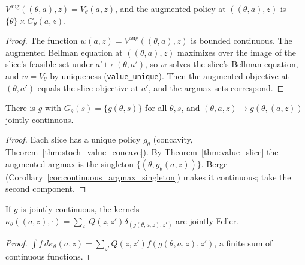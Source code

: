 \begin{theorem}
\label{thm:value_slice}
\leanok
{}
$V^{\mathrm{aug}}((\theta,a),z) = V_\theta(a,z)$, and the augmented policy at $((\theta,a),z)$ is
$\{\theta\}\times G_\theta(a,z)$.
\end{theorem}
\begin{proof}
\leanok
The function $w(a,z) = V^{\mathrm{aug}}((\theta,a),z)$ is bounded continuous. The augmented Bellman equation at
$((\theta,a),z)$ maximizes over the image of the slice's feasible set under $a'\mapsto(\theta,a')$, so $w$ solves
the slice's Bellman equation, and $w = V_\theta$ by uniqueness (\texttt{value\_unique}). Then the augmented
objective at $(\theta,a')$ equals the slice objective at $a'$, and the argmax sets correspond.
\end{proof}

\begin{theorem}
\label{thm:exists_joint_policy}
\leanok
{}
There is $g$ with $G_\theta(s) = \{g(\theta,s)\}$ for all $\theta, s$, and $(\theta,a,z)\mapsto g(\theta,(a,z))$
jointly continuous.
\end{theorem}
\begin{proof}
\leanok
{}
Each slice has a unique policy $g_\theta$ (concavity, Theorem~\ref{thm:stoch_value_concave}). By
Theorem~\ref{thm:value_slice} the augmented argmax is the singleton $\{(\theta, g_\theta(a,z))\}$. Berge
(Corollary~\ref{cor:continuous_argmax_singleton}) makes it continuous; take the second component.
\end{proof}

\begin{lemma}
\label{lem:isJointlyFeller_policyKernel}
\leanok
{}
If $g$ is jointly continuous, the kernels $\kappa_\theta((a,z),\cdot) = \sum_{z'} Q(z,z')\delta_{(g(\theta,a,z),z')}$
are jointly Feller.
\end{lemma}
\begin{proof}
\leanok
{}
$\int f\,d\kappa_\theta(a,z) = \sum_{z'}Q(z,z') f(g(\theta,a,z),z')$, a finite sum of continuous functions.
\end{proof}

